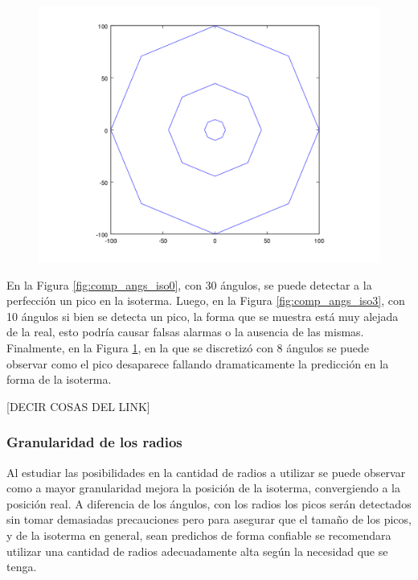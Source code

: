 \begin{figure}[H]
\begin{minipage}{0.30\textwidth}
  \centering
    \includegraphics[width=1\textwidth]{imgs/comp_angulos/comp_angs_iso4.png} 
  \caption{}
  \label{fig:comp_angs_iso4}
\end{minipage}

\end{figure}

En la Figura \ref{fig:comp_angs_iso0}, con 30 ángulos, se puede detectar a la perfección un pico en la isoterma. Luego, en la Figura \ref{fig:comp_angs_iso3}, con 10 ángulos si bien se detecta un pico, la forma que se muestra está muy alejada de la real, esto podría causar falsas alarmas o la ausencia de las mismas.
Finalmente, en la Figura \ref{fig:comp_angs_iso4}, en la que se discretizó con 8 ángulos se puede observar como el pico desaparece fallando dramaticamente la predicción en la forma de la isoterma.

[DECIR COSAS DEL LINK]


\subsubsection{Granularidad de los radios}
Al estudiar las posibilidades en la cantidad de radios a utilizar se puede observar como a mayor granularidad mejora la posición de la isoterma, convergiendo a la posición real. A diferencia de los ángulos, con los radios los picos serán detectados sin tomar demasiadas precauciones pero para asegurar que el tamaño de los picos, y de la isoterma en general, sean predichos de forma confiable se recomendara utilizar una cantidad de radios adecuadamente alta según la necesidad que se tenga.

